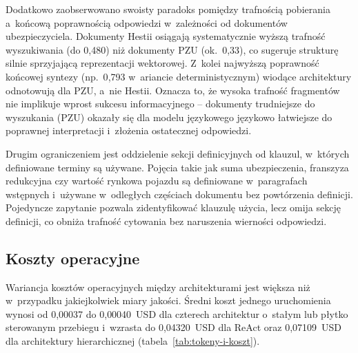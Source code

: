 Dodatkowo zaobserwowano swoisty paradoks pomiędzy trafnością pobierania a~końcową
poprawnością odpowiedzi w~zależności od dokumentów ubezpieczyciela.
Dokumenty Hestii osiągają systematycznie wyższą trafność wyszukiwania
(do 0{,}480) niż dokumenty PZU (ok.~0{,}33), co sugeruje strukturę silnie
sprzyjającą reprezentacji wektorowej. Z~kolei najwyższą poprawność końcowej
syntezy (np.~0{,}793 w~ariancie deterministycznym) wiodące architektury
odnotowują dla PZU, a~nie Hestii. Oznacza to, że wysoka trafność fragmentów
nie implikuje wprost sukcesu informacyjnego -- dokumenty trudniejsze do
wyszukania (PZU) okazały się dla modelu językowego językowo łatwiejsze do
poprawnej interpretacji i~złożenia ostatecznej odpowiedzi.

Drugim ograniczeniem jest oddzielenie sekcji definicyjnych od klauzul,
w~których definiowane terminy są używane. Pojęcia takie jak suma ubezpieczenia,
franszyza redukcyjna czy wartość rynkowa pojazdu są definiowane w~paragrafach
wstępnych i~używane w~odległych częściach dokumentu bez powtórzenia definicji.
Pojedyncze zapytanie pozwala zidentyfikować klauzulę użycia, lecz omija sekcję
definicji, co obniża trafność cytowania bez naruszenia wierności odpowiedzi.

\subsection{Koszty operacyjne}\label{subsec:koszty-operacyjne}

Wariancja kosztów operacyjnych między architekturami jest większa niż
w~przypadku jakiejkolwiek miary jakości. Średni koszt jednego uruchomienia
wynosi od 0{,}00037 do 0{,}00040~USD dla czterech architektur o~stałym lub
płytko sterowanym przebiegu i~wzrasta do 0{,}04320~USD dla ReAct oraz
0{,}07109~USD dla architektury hierarchicznej
(tabela~\ref{tab:tokeny-i-koszt}).

